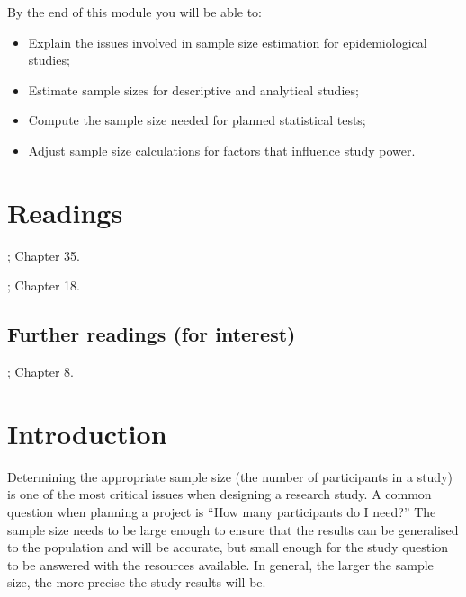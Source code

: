 \documentclass[
]{memoir}
\providecommand{\tightlist}{%
  \setlength{\itemsep}{0pt}\setlength{\parskip}{0pt}}
\begin{document}
By the end of this module you will be able to:

\begin{itemize}
\tightlist
\item
  Explain the issues involved in sample size estimation for epidemiological studies;
\item
  Estimate sample sizes for descriptive and analytical studies;
\item
  Compute the sample size needed for planned statistical tests;
\item
  Adjust sample size calculations for factors that influence study power.
\end{itemize}

\hypertarget{readings-9}{%
\section*{Readings}\label{readings-9}}

\citet{kirkwood_sterne01}; Chapter 35.

\citet{bland15}; Chapter 18.

\hypertarget{further-readings-for-interest}{%
\subsection*{Further readings (for interest)}\label{further-readings-for-interest}}

\citet{woodward13}; Chapter 8.

\hypertarget{introduction-9}{%
\section{Introduction}\label{introduction-9}}

Determining the appropriate sample size (the number of participants in a study) is one of the most critical issues when designing a research study. A common question when planning a project is ``How many participants do I need?'' The sample size needs to be large enough to ensure that the results can be generalised to the population and will be accurate, but small enough for the study question to be answered with the resources available. In general, the larger the sample size, the more precise the study results will be.
\end{document}
